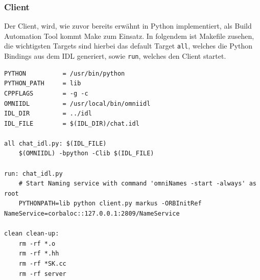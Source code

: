 \subsubsection{Client}
Der Client, wird, wie zuvor bereits erw\"ahnt in Python implementiert, als Build Automation Tool kommt Make zum Einsatz.
In folgendem ist Makefile zusehen, die wichtigsten Targets sind hierbei das default Target \texttt{all}, welches die Python Bindings aus dem IDL generiert, sowie \texttt{run}, welches den Client startet.
\begin{lstlisting}[language=Make, caption=Makefile des Clients]
PYTHON         	= /usr/bin/python
PYTHON_PATH     = lib
CPPFLAGS      	= -g -c
OMNIIDL       	= /usr/local/bin/omniidl
IDL_DIR		    = ../idl
IDL_FILE	    = $(IDL_DIR)/chat.idl

all chat_idl.py: $(IDL_FILE)
	$(OMNIIDL) -bpython -Clib $(IDL_FILE)

run: chat_idl.py
	# Start Naming service with command 'omniNames -start -always' as root
	PYTHONPATH=lib python client.py markus -ORBInitRef NameService=corbaloc::127.0.0.1:2809/NameService

clean clean-up:
	rm -rf *.o
	rm -rf *.hh
	rm -rf *SK.cc
	rm -rf server
\end{lstlisting}

